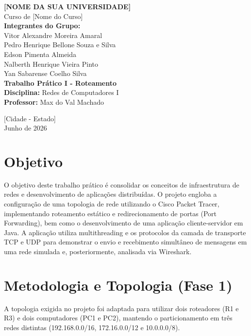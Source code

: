 \documentclass[12pt,a4paper]{article}
\begin{document}
\begin{titlepage}
    \centering
    \vspace*{2cm}
    
    {\Large \textbf{[NOME DA SUA UNIVERSIDADE]}}\\[0.5cm]
    {\large Curso de [Nome do Curso]}\\[3cm]
    
    {\Large \textbf{Integrantes do Grupo:}}\\[0.5cm]
    Vitor Alexandre Moreira Amaral \\
    Pedro Henrique Bellone Souza e Silva \\
    Edson Pimenta Almeida \\
    Nalberth Henrique Vieira Pinto \\
    Yan Sabarense Coelho Silva \\[3cm]
    
    {\huge \textbf{Trabalho Prático I - Roteamento}}\\[1.5cm]
    
    {\large \textbf{Disciplina:} Redes de Computadores I}\\[0.5cm]
    {\large \textbf{Professor:} Max do Val Machado}
    
    \vfill
    
    {\large [Cidade - Estado]}\\[0.5cm]
    {\large Junho de 2026}
\end{titlepage}

\newpage

\section{Objetivo}
O objetivo deste trabalho prático é consolidar os conceitos de infraestrutura de redes e desenvolvimento de aplicações distribuídas. O projeto engloba a configuração de uma topologia de rede utilizando o Cisco Packet Tracer, implementando roteamento estático e redirecionamento de portas (Port Forwarding), bem como o desenvolvimento de uma aplicação cliente-servidor em Java. A aplicação utiliza multithreading e os protocolos da camada de transporte TCP e UDP para demonstrar o envio e recebimento simultâneo de mensagens em uma rede simulada e, posteriormente, analisada via Wireshark.

\section{Metodologia e Topologia (Fase 1)}
A topologia exigida no projeto foi adaptada para utilizar dois roteadores (R1 e R3) e dois computadores (PC1 e PC2), mantendo o particionamento em três redes distintas (192.168.0.0/16, 172.16.0.0/12 e 10.0.0.0/8).
\end{document}
